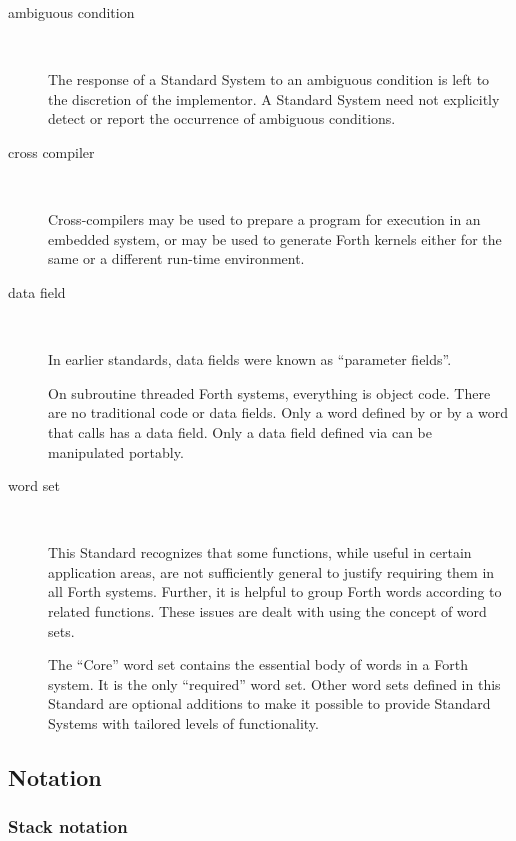 \begin{description}
\item[ambiguous condition] ~

The response of a Standard System to an ambiguous condition is left
to the discretion of the implementor. A Standard System need not
explicitly detect or report the occurrence of ambiguous conditions.

\item[cross compiler] ~

Cross-compilers may be used to prepare a program for execution in an
embedded system, or may be used to generate Forth kernels either for
the same or a different run-time environment.

\item[data field] ~

In earlier standards, data fields were known as ``parameter fields''.

On subroutine threaded Forth systems, everything is object code.
There are no traditional code or data fields. Only a word defined by
 or by a word that calls  has a data field.
Only a data field defined via  can be manipulated portably.

\item[word set] ~

This Standard recognizes that some functions, while useful in certain
application areas, are not sufficiently general to justify requiring
them in all Forth systems. Further, it is helpful to group Forth
words according to related functions. These issues are dealt with
using the concept of word sets.

The ``Core'' word set contains the essential body of words in a Forth
system. It is the only ``required'' word set. Other word sets defined
in this Standard are optional additions to make it possible to
provide Standard Systems with tailored levels of functionality.
\end{description}

\subsection{Notation} %

\addtocounter{subsubsection}{1}
\subsubsection{Stack notation} %

